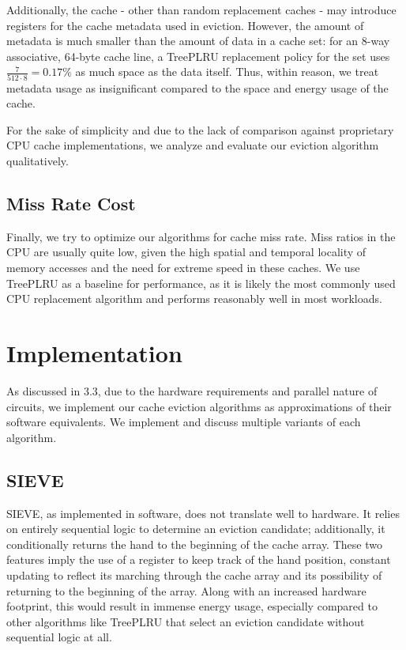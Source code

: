 \documentclass[letterpaper]{article}
\begin{document}
Additionally, the cache - other than random replacement caches - may introduce registers for the cache metadata used in eviction.
However, the amount of metadata is much smaller than the amount of data in a cache set:
for an 8-way associative, 64-byte cache line, a TreePLRU replacement policy for the set uses
$\frac{7}{512 \cdot 8}=0.17\%$ as much space as the data itself.
Thus, within reason, we treat metadata usage as insignificant compared to the space and energy usage of the cache.

For the sake of simplicity and due to the lack of comparison against proprietary CPU cache implementations,
we analyze and evaluate our eviction algorithm qualitatively.

\subsection{Miss Rate Cost}

Finally, we try to optimize our algorithms for cache miss rate.
Miss ratios in the CPU are usually quite low,
given the high spatial and temporal locality of memory accesses
and the need for extreme speed in these caches.
We use TreePLRU as a baseline for performance,
as it is likely the most commonly used CPU replacement algorithm
and performs reasonably well in most workloads.

\section{Implementation}

As discussed in 3.3, due to the hardware requirements and parallel nature of circuits,
we implement our cache eviction algorithms as approximations of their software equivalents.
We implement and discuss multiple variants of each algorithm.

\subsection{SIEVE}

SIEVE, as implemented in software, does not translate well to hardware.
It relies on entirely sequential logic to determine an eviction candidate;
additionally, it conditionally returns the hand to the beginning of the cache array.
These two features imply the use of a register to keep track of the hand position,
constant updating to reflect its marching through the cache array
and its possibility of returning to the beginning of the array.
Along with an increased hardware footprint, this would result in immense energy usage,
especially compared to other algorithms like TreePLRU that select an eviction candidate
without sequential logic at all.
\end{document}
